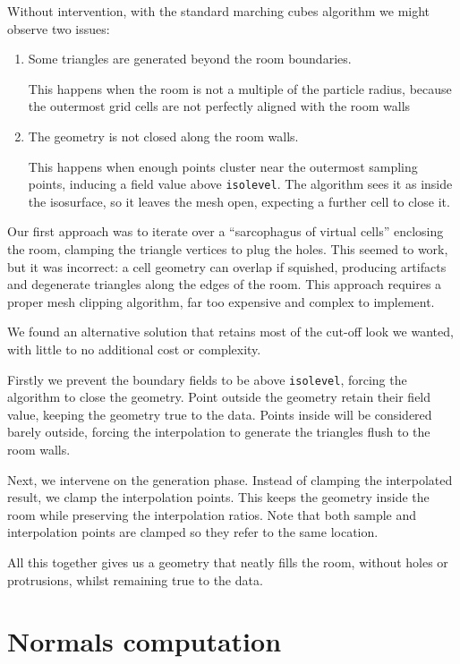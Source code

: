\documentclass[a4paper]{report}
\begin{document}
Without intervention, with the standard marching cubes algorithm we might observe two issues:

\begin{enumerate}
  \item Some triangles are generated beyond the room boundaries.
  
  This happens when the room is not a multiple of the particle radius, because the outermost grid cells are not perfectly aligned with the room walls
  \item The geometry is not closed along the room walls.
  
  This happens when enough points cluster near the outermost sampling points, inducing a field value above \lstinline{isolevel}. The algorithm sees it as inside the isosurface, so it leaves the mesh open, expecting a further cell to close it.
\end{enumerate}

Our first approach was to iterate over a ``sarcophagus of virtual cells'' enclosing the room, clamping the triangle vertices to plug the holes. This seemed to work, but it was incorrect: a cell geometry can overlap if squished, producing artifacts and degenerate triangles along the edges of the room. This approach requires a proper mesh clipping algorithm, far too expensive and complex to implement.

We found an alternative solution that retains most of the cut-off look we wanted, with little to no additional cost or complexity.

Firstly we prevent the boundary fields to be above \lstinline{isolevel}, forcing the algorithm to close the geometry. Point outside the geometry retain their field value, keeping the geometry true to the data. Points inside will be considered barely outside, forcing the interpolation to generate the triangles flush to the room walls.

Next, we intervene on the generation phase. Instead of clamping the interpolated result, we clamp the interpolation points. This keeps the geometry inside the room while preserving the interpolation ratios. Note that both sample and interpolation points are clamped so they refer to the same location. 

All this together gives us a geometry that neatly fills the room, without holes or protrusions, whilst remaining true to the data.

\section{Normals computation}
\end{document}
